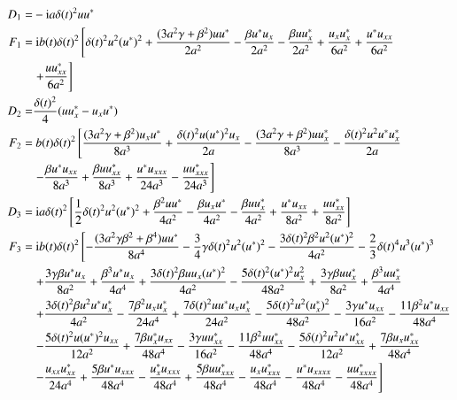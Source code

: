 \begin{align}
  D_{1} =& -\mathrm{i}a\delta(t)^{2} uu^{*} \\
  F_{1} =&\ \mathrm{i}b(t)\delta(t)^{2} \left[\delta(t)^2u^2(u^*)^2 + \frac{(3a^2 \gamma + \beta^2)uu^*}{2a^2} - \frac{\beta u^*u_x}{2a^2} - \frac{\beta uu^*_x}{2a^2} + \frac{u_xu^*_x}{6a^2} + \frac{u^*u_{xx}}{6a^2} \right. \notag \\
  & \left. + \frac{uu^*_{xx}}{6a^2} \right] \\
  D_{2} =& \frac{\delta(t)^{2}}{4}(uu^{*}_{x} - u_{x}u^{*}) \\
  F_{2} =&\ b(t)\delta(t)^{2} \left[\frac{(3a^2\gamma+\beta^2)u_xu^*}{8a^3} + \frac{\delta(t)^2u(u^*)^2u_x}{2a} - \frac{(3a^2\gamma+\beta^2)uu^*_x}{8a^3} - \frac{\delta(t)^2u^2u^*u^*_x}{2a} \right. \notag\\
  & \left. - \frac{\beta u^*u_{xx}}{8a^3} + \frac{\beta uu^*_{xx}}{8a^3} + \frac{u^*u_{xxx}}{24a^3} - \frac{uu^*_{xxx}}{24a^3}\right] \\
  D_{3} =&\ \mathrm{i}a\delta(t)^2\left[\frac{1}{2}\delta(t)^2u^2(u^*)^2 + \frac{\beta^2 uu^*}{4a^2} - \frac{\beta u_xu^*}{4a^2} - \frac{\beta uu^*_x}{4a^2} + \frac{u^*u_{xx}}{8a^2} + \frac{uu^*_{xx}}{8a^2}\right] \\
  F_{3} =&\ \mathrm{i}b(t)\delta(t)^{2} \left[ -\frac{(3a^2\gamma\beta^2+\beta^4)uu^*}{8a^4} -\frac{3}{4}\gamma\delta(t)^2u^2(u^*)^2 -\frac{3\delta(t)^2\beta^2 u^2(u^*)^2}{4a^2} -\frac{2}{3}\delta(t)^4u^3(u^*)^3 \right. \notag \\
  & \left. + \frac{3\gamma\beta u^*u_x}{8a^2} + \frac{\beta^3 u^*u_x}{4a^4} + \frac{3\delta(t)^2\beta uu_x(u^*)^2}{4a^2} -\frac{5\delta(t)^2(u^*)^2u_x^2}{48a^2} + \frac{3\gamma\beta uu^*_x}{8a^2} + \frac{\beta^3 uu^*_x}{4a^4} \right. \notag \\
  & \left. + \frac{3\delta(t)^2\beta u^2u^*u^*_x}{4a^2} - \frac{7\beta^2 u_xu^*_x}{24a^4} +\frac{7\delta(t)^2 uu^*u_xu^*_x}{24a^2} - \frac{5\delta(t)^2 u^2(u^*_x)^2}{48a^2} -\frac{3\gamma u^*u_{xx}}{16a^2} -\frac{11\beta^2u^*u_{xx}}{48a^4} \right. \notag\\
  & \left. -\frac{5\delta(t)^2u(u^*)^2u_{xx}}{12a^2} + \frac{7\beta u^*_xu_{xx}}{48a^4} -\frac{3\gamma uu^*_{xx}}{16a^2} - \frac{11\beta^2 uu^*_{xx}}{48a^4} - \frac{5\delta(t)^2u^2u^*u^*_{xx}}{12a^2} + \frac{7\beta u_xu^*_{xx}}{48a^4} \right. \notag \\
  & \left. -\frac{u_{xx}u^*_{xx}}{24a^4} + \frac{5\beta u^*u_{xxx}}{48a^4} - \frac{u^*_xu_{xxx}}{48a^4} + \frac{5\beta uu^*_{xxx}}{48a^4} - \frac{u_xu^*_{xxx}}{48a^4} -\frac{u^*u_{xxxx}}{48a^4} -\frac{uu^*_{xxxx}}{48a^4}\right]
\end{align}

